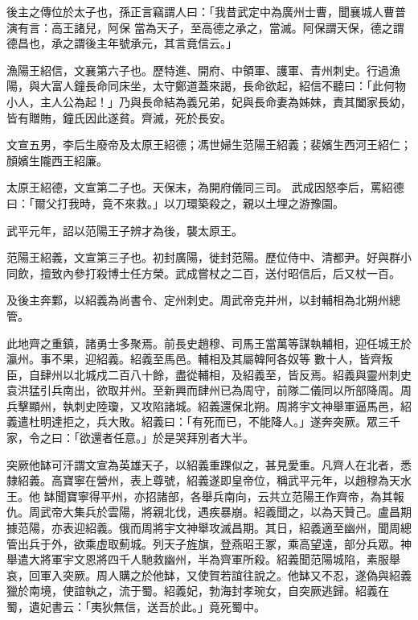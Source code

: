 \begin{pinyinscope}
 後主之傳位於太子也，孫正言竊謂人曰：「我昔武定中為廣州士曹，聞襄城人曹普演有言：高王諸兒，阿保
 當為天子，至高德之承之，當滅。阿保謂天保，德之謂德昌也，承之謂後主年號承元，其言竟信云。」



 漁陽王紹信，文襄第六子也。歷特進、開府、中領軍、護軍、青州刺史。行過漁陽，與大富人鐘長命同床坐，太守鄭道蓋來謁，長命欲起，紹信不聽曰：「此何物小人，主人公為起！」乃與長命結為義兄弟，妃與長命妻為姊妹，責其闔家長幼，皆有贈賄，鐘氏因此遂貧。齊滅，死於長安。



 文宣五男，李后生廢帝及太原王紹德；馮世婦生范陽王紹義；裴嬪生西河王紹仁；顏嬪生隴西王紹廉。



 太原王紹德，文宣第二子也。天保末，為開府儀同三司。
 武成因怒李后，罵紹德曰：「爾父打我時，竟不來救。」以刀環築殺之，親以土埋之游豫園。



 武平元年，詔以范陽王子辨才為後，襲太原王。



 范陽王紹義，文宣第三子也。初封廣陽，徙封范陽。歷位侍中、清都尹。好與群小同飲，擅致內參打殺博士任方榮。武成嘗杖之二百，送付昭信后，后又杖一百。



 及後主奔鄴，以紹義為尚書令、定州刺史。周武帝克并州，以封輔相為北朔州總管。



 此地齊之重鎮，諸勇士多聚焉。前長史趙穆、司馬王當萬等謀執輔相，迎任城王於瀛州。事不果，迎紹義。紹義至馬邑。輔相及其屬韓阿各奴等
 數十人，皆齊叛臣，自肆州以北城戍二百八十餘，盡從輔相，及紹義至，皆反焉。紹義與靈州刺史袁洪猛引兵南出，欲取并州。至新興而肆州已為周守，前隊二儀同以所部降周。周兵擊顯州，執刺史陸瓊，又攻陷諸城。紹義還保北朔。周將宇文神舉軍逼馬邑，紹義遣杜明達拒之，兵大敗。紹義曰：「有死而已，不能降人。」遂奔突厥。眾三千家，令之曰：「欲還者任意。」於是哭拜別者大半。



 突厥他缽可汗謂文宣為英雄天子，以紹義重踝似之，甚見愛重。凡齊人在北者，悉隸紹義。高寶寧在營州，表上尊號，紹義遂即皇帝位，稱武平元年，以趙穆為天水王。他
 缽聞寶寧得平州，亦招諸部，各舉兵南向，云共立范陽王作齊帝，為其報仇。周武帝大集兵於雲陽，將親北伐，遇疾暴崩。紹義聞之，以為天贊己。盧昌期據范陽，亦表迎紹義。俄而周將宇文神舉攻滅昌期。其日，紹義適至幽州，聞周總管出兵于外，欲乘虛取薊城。列天子旌旗，登燕昭王冢，乘高望遠，部分兵眾。神舉遣大將軍宇文恩將四千人馳救幽州，半為齊軍所殺。紹義聞范陽城陷，素服舉哀，回軍入突厥。周人購之於他缽，又使賀若誼往說之。他缽又不忍，遂偽與紹義獵於南境，使誼執之，流于蜀。紹義妃，勃海封孝琬女，自突厥逃歸。紹義在
 蜀，遺妃書云：「夷狄無信，送吾於此。」竟死蜀中。




\end{pinyinscope}
